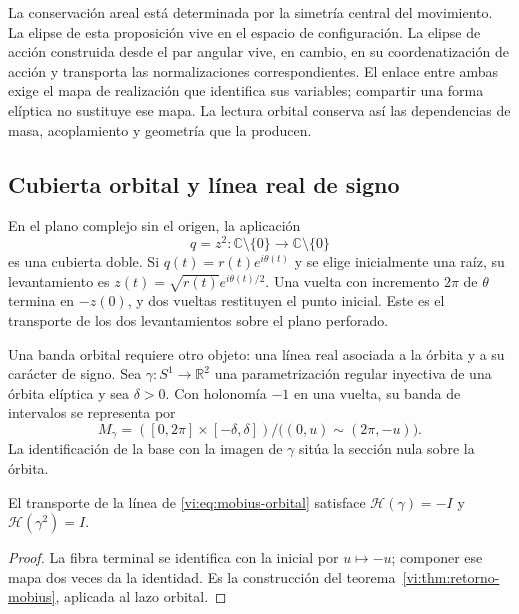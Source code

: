 La conservación areal está determinada por la simetría central
del movimiento. La elipse de esta proposición vive en el
espacio de configuración. La elipse de acción construida
desde el par angular vive, en cambio, en su coordenatización de acción
y transporta las normalizaciones correspondientes. El enlace
entre ambas exige el mapa de realización que identifica sus
variables; compartir una forma elíptica no sustituye ese mapa.
La lectura orbital conserva así las dependencias de masa,
acoplamiento y geometría que la producen.

\subsection{Cubierta orbital y línea real de signo}
\label{vi:subsec:cubierta-orbital}

En el plano complejo sin el origen, la aplicación
\begin{equation}
 q=z^2:\mathbb C\setminus\{0\}\longrightarrow
                 \mathbb C\setminus\{0\}
 \label{vi:eq:levi-civita}
\end{equation}
es una cubierta doble. Si $q(t)=r(t)e^{i\theta(t)}$ y se
elige inicialmente una raíz, su levantamiento es
$z(t)=\sqrt{r(t)}e^{i\theta(t)/2}$. Una vuelta con incremento
$2\pi$ de $\theta$ termina en $-z(0)$, y dos vueltas
restituyen el punto inicial. Este es el transporte de los dos
levantamientos sobre el plano perforado.

Una banda orbital requiere otro objeto: una línea real
asociada a la órbita y a su carácter de signo. Sea
$\gamma:S^1\to\mathbb R^2$ una parametrización regular
inyectiva de una órbita elíptica y sea $\delta>0$. Con
holonomía $-1$ en una vuelta, su banda de intervalos se
representa por
\begin{equation}
 M_\gamma=([0,2\pi]\times[-\delta,\delta])/
          \bigl((0,u)\sim(2\pi,-u)\bigr).
 \label{vi:eq:mobius-orbital}
\end{equation}
La identificación de la base con la imagen de $\gamma$
sitúa la sección nula sobre la órbita.

\begin{proposition}
\label{vi:prop:holonomia-orbital}
El transporte de la línea de \eqref{vi:eq:mobius-orbital}
satisface
$\mathcal H(\gamma)=-I$ y $\mathcal H(\gamma^2)=I$.
\end{proposition}
\begin{proof}
La fibra terminal se identifica con la inicial por
$u\mapsto-u$; componer ese mapa dos veces da la identidad.
Es la construcción del
teorema~\ref{vi:thm:retorno-mobius}, aplicada al lazo orbital.
\end{proof}

